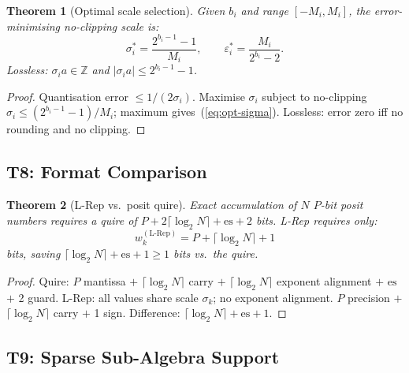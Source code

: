 \documentclass[11pt,a4paper]{article}
\theoremstyle{definition}
\theoremstyle{plain}
\newtheorem{theorem}{Theorem}[section]
\theoremstyle{remark}
\begin{document}
\begin{theorem}[Optimal scale selection]
\label{thm:quant}
Given $b_i$ and range $[-M_i,M_i]$, the error-minimising no-clipping scale is:
\begin{equation}\label{eq:opt-sigma}
  \sigma_i^*=\frac{2^{b_i-1}-1}{M_i}, \qquad
  \varepsilon_i^*=\frac{M_i}{2^{b_i}-2}.
\end{equation}
Lossless: $\sigma_i a\in\mathbb{Z}$ and $|\sigma_i a|\le2^{b_i-1}-1$.
\end{theorem}

\begin{proof}
Quantisation error $\le1/(2\sigma_i)$.
Maximise $\sigma_i$ subject to no-clipping $\sigma_i\le(2^{b_i-1}-1)/M_i$;
maximum gives~(\ref{eq:opt-sigma}).
Lossless: error zero iff no rounding and no clipping.
\end{proof}

\subsection{T8: Format Comparison}
\label{sec:format}

\begin{theorem}[L-Rep vs.\ posit quire]
\label{thm:format}
Exact accumulation of $N$ $P$-bit posit numbers requires a quire of
$P+2\lceil\log_2 N\rceil+\mathrm{es}+2$ bits.
L-Rep requires only:
\begin{equation}
  w_k^{(\mathrm{L\text{-}Rep})}=P+\lceil\log_2 N\rceil+1
\end{equation}
bits, saving $\lceil\log_2 N\rceil+\mathrm{es}+1\ge1$ bits vs.\ the quire.
\end{theorem}

\begin{proof}
Quire: $P$ mantissa $+$ $\lceil\log_2 N\rceil$ carry $+$
$\lceil\log_2 N\rceil$ exponent alignment $+$ $\mathrm{es}$ $+$ 2 guard.
L-Rep: all values share scale $\sigma_k$; no exponent alignment.
$P$ precision $+$ $\lceil\log_2 N\rceil$ carry $+$ 1 sign.
Difference: $\lceil\log_2 N\rceil+\mathrm{es}+1$.
\end{proof}

\subsection{T9: Sparse Sub-Algebra Support}
\label{sec:sparse}
\end{document}
